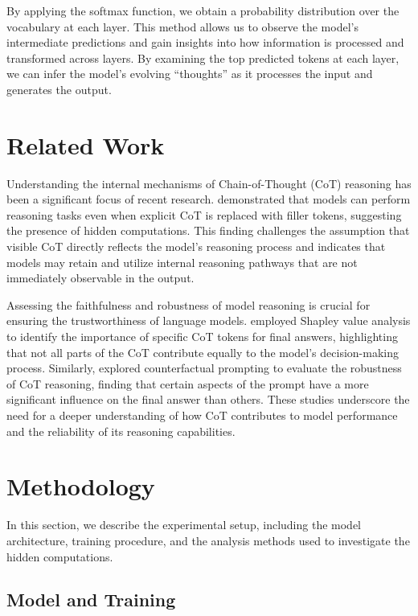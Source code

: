 \documentclass{article}
\begin{document}
By applying the softmax function, we obtain a probability distribution over the vocabulary at each layer. This method allows us to observe the model's intermediate predictions and gain insights into how information is processed and transformed across layers. By examining the top predicted tokens at each layer, we can infer the model's evolving ``thoughts'' as it processes the input and generates the output.

\newpage
\section{Related Work}

Understanding the internal mechanisms of Chain-of-Thought (CoT) reasoning has been a significant focus of recent research. \cite{pfau2023let} demonstrated that models can perform reasoning tasks even when explicit CoT is replaced with filler tokens, suggesting the presence of hidden computations. This finding challenges the assumption that visible CoT directly reflects the model's reasoning process and indicates that models may retain and utilize internal reasoning pathways that are not immediately observable in the output.

Assessing the faithfulness and robustness of model reasoning is crucial for ensuring the trustworthiness of language models. \cite{gao2023shapley} employed Shapley value analysis to identify the importance of specific CoT tokens for final answers, highlighting that not all parts of the CoT contribute equally to the model's decision-making process. Similarly, \cite{madaan2022text} explored counterfactual prompting to evaluate the robustness of CoT reasoning, finding that certain aspects of the prompt have a more significant influence on the final answer than others. These studies underscore the need for a deeper understanding of how CoT contributes to model performance and the reliability of its reasoning capabilities.

\section{Methodology}

In this section, we describe the experimental setup, including the model architecture, training procedure, and the analysis methods used to investigate the hidden computations.

\subsection{Model and Training}
\end{document}
